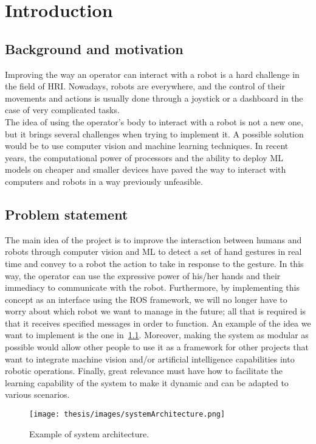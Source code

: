 \documentclass[../thesis.tex]{subfiles}
\begin{document}
\chapter{Introduction}\label{cap:introduction}

\section{Background and motivation}
Improving the way an operator can interact with a robot is a hard challenge in the field of \acrfull{HRI}. Nowadays, robots are everywhere, and the control of their movements and actions is usually done through a joystick or a dashboard in the case of very complicated tasks.\\
The idea of using the operator's body to interact with a robot is not a new one, but it brings several challenges when trying to implement it. A possible solution would be to use computer vision and machine learning techniques. In recent years, the computational power of processors and the ability to deploy \acrfull{ML} models on cheaper and smaller devices have paved the way to interact with computers and robots in a way previously unfeasible.

\section{Problem statement}
The main idea of the project is to improve the interaction between humans and robots through computer vision and \acrshort{ML} to detect a set of hand gestures in real time and convey to a robot the action to take in response to the gesture. In this way, the operator can use the expressive power of his/her hands and their immediacy to communicate with the robot. Furthermore, by implementing this concept as an interface using the \acrfull{ROS} framework, we will no longer have to worry about which robot we want to manage in the future; all that is required is that it receives specified messages in order to function. An example of the idea we want to implement is the one in~\ref{fig:systemArchitecture}. Moreover, making the system as modular as possible would allow other people to use it as a framework for other projects that want to integrate machine vision and/or artificial intelligence capabilities into robotic operations. Finally, great relevance must have how to facilitate the learning capability of the system to make it dynamic and can be adapted to various scenarios.

\begin{figure}
  \centering
  \texttt{[image: thesis/images/systemArchitecture.png]}
  \caption{Example of system architecture.}
  \label{fig:systemArchitecture}
\end{figure}
\end{document}
